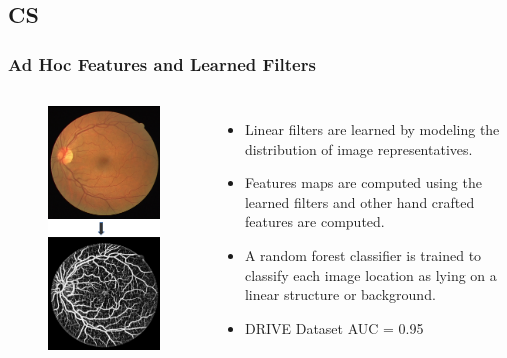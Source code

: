 \documentclass{beamer}
\begin{document}

\subsection{CS}

\begin{frame}
\frametitle{Ad Hoc Features and Learned Filters}
\begin{columns}[c] %

\begin{figure}
\includegraphics[width=0.6\linewidth]{Images/CS.png}
\end{figure}

\begin{itemize}
\item Linear filters are learned by modeling the distribution of image representatives.
\item Features maps are computed using the learned filters and other hand crafted features  are computed.
\item A random forest classifier is trained to classify each image location as lying on a linear structure or background.
\item DRIVE Dataset AUC  = 0.95
\end{itemize}



\end{columns}

\end{frame}
\end{document}
